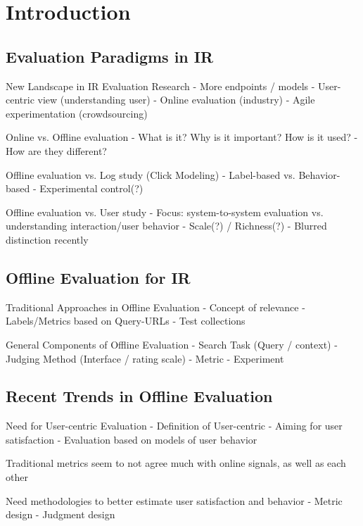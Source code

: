 \documentclass[openany]{now} %
\begin{document}
\chapter{Introduction}
\label{c-intro}

\section{Evaluation Paradigms in IR}

New Landscape in IR Evaluation Research
- More endpoints / models
- User-centric view (understanding user)
- Online evaluation (industry)
- Agile experimentation (crowdsourcing)

Online vs. Offline evaluation
- What is it? Why is it important? How is it used?
- How are they different?
\cite{INR-XYZ}\cite{INR-009} 

Offline evaluation vs. Log study (Click Modeling)
- Label-based vs. Behavior-based
- Experimental control(?)

Offline evaluation vs. User study
- Focus: system-to-system evaluation vs. understanding interaction/user behavior
- Scale(?) / Richness(?)
- Blurred distinction recently
\cite{Bron:2013}
\cite{Liu:2014}
\cite{Shah:2011}


\section{Offline Evaluation for IR}

Traditional Approaches in Offline Evaluation
- Concept of relevance 
- Labels/Metrics based on Query-URLs
- Test collections 
\cite{borlund2003} \cite{cleverdon67} \cite{voor:trec05}

General Components of Offline Evaluation
-	Search Task (Query / context)
-	Judging Method (Interface / rating scale) 
-	Metric
-	Experiment

\section{Recent Trends in Offline Evaluation}

Need for User-centric Evaluation
- Definition of User-centric
- Aiming for user satisfaction
- Evaluation based on models of user behavior

Traditional metrics seem to not agree much with online signals, as well as each other
\cite{radl:comp10}


Need methodologies to better estimate user satisfaction and behavior
-	Metric design
-	Judgment design
\end{document}
